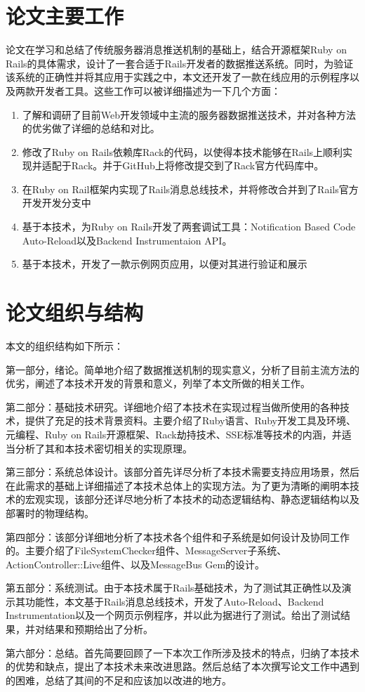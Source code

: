 \section{论文主要工作}
论文在学习和总结了传统服务器消息推送机制的基础上，结合开源框架Ruby on Rails的具体需求，设计了一套合适于Rails开发者的数据推送系统。同时，为验证该系统的正确性并将其应用于实践之中，本文还开发了一款在线应用的示例程序以及两款开发者工具。这些工作可以被详细描述为一下几个方面：
\begin{enumerate}
\item 了解和调研了目前Web开发领域中主流的服务器数据推送技术，并对各种方法的优劣做了详细的总结和对比。
\item 修改了Ruby on Rails依赖库Rack的代码，以使得本技术能够在Rails上顺利实现并适配于Rack。并于GitHub上将修改提交到了Rack官方代码库中。
\item 在Ruby on Rail框架内实现了Rails消息总线技术，并将修改合并到了Rails官方开发开发分支中
\item 基于本技术，为Ruby on Rails开发了两套调试工具：Notification Based Code Auto-Reload以及Backend Instrumentaion API。
\item 基于本技术，开发了一款示例网页应用，以便对其进行验证和展示
\end{enumerate}

\section{论文组织与结构}
本文的组织结构如下所示：

第一部分，绪论。简单地介绍了数据推送机制的现实意义，分析了目前主流方法的优劣，阐述了本技术开发的背景和意义，列举了本文所做的相关工作。

第二部分：基础技术研究。详细地介绍了本技术在实现过程当做所使用的各种技术，提供了充足的技术背景资料。主要介绍了Ruby语言、Ruby开发工具及环境、元编程、Ruby on Rails开源框架、Rack劫持技术、SSE标准等技术的内涵，并适当分析了其和本技术密切相关的实现原理。

第三部分：系统总体设计。该部分首先详尽分析了本技术需要支持应用场景，然后在此需求的基础上详细描述了本技术总体上的实现方法。为了更为清晰的阐明本技术的宏观实现，该部分还详尽地分析了本技术的动态逻辑结构、静态逻辑结构以及部署时的物理结构。

第四部分：该部分详细地分析了本技术各个组件和子系统是如何设计及协同工作的。主要介绍了FileSystemChecker组件、MessageServer子系统、ActionController::Live组件、以及MessageBus Gem的设计。

第五部分：系统测试。由于本技术属于Rails基础技术，为了测试其正确性以及演示其功能性，本文基于Rails消息总线技术，开发了Auto-Reload、Backend Instrumentation以及一个网页示例程序，并以此为据进行了测试。给出了测试结果，并对结果和预期给出了分析。

第六部分：总结。首先简要回顾了一下本次工作所涉及技术的特点，归纳了本技术的优势和缺点，提出了本技术未来改进思路。然后总结了本次撰写论文工作中遇到的困难，总结了其间的不足和应该加以改进的地方。